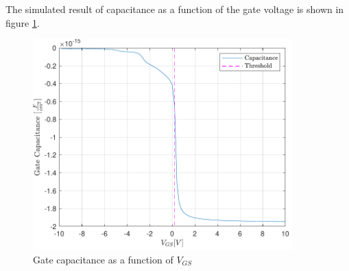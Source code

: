 \documentclass[11pt,a4paper]{article}
\begin{document}
	The simulated result of capacitance as a function of the gate voltage is shown in figure \ref*{capacitance1}.
	\begin{figure}
		\centering
		\includegraphics[width=100mm]{capacitance1}
		\caption{Gate capacitance as a function of $V_{GS}$}
		\label{capacitance1}
	\end{figure}
\end{document}
